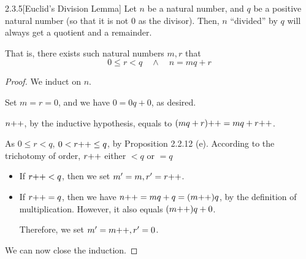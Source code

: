 \begin{exercise}{2.3.5}[Euclid's Division Lemma]
	Let $n$ be a natural number, and $q$ be a positive natural number (so that it is not 0 as the divisor). Then, $n$ ``divided'' by $q$ will always get a quotient and a remainder.
	
	That is, there exists such natural numbers $m,r$ that 
	\[
	0 \le r < q \quad \wedge \quad n = mq + r
	\]
\end{exercise}
\begin{proof}
	We induct on $n$.
	
	\mybcbox Set $m = r = 0$, and we have $0 = 0q + 0$, as desired.
	
	\myisbox $n{+}{+}$, by the inductive hypothesis, equals to $(mq+r){+}{+} = mq+r{+}{+}$.
	
	As $0 \le r < q$, $0 < r{+}{+} \le q$, by Proposition 2.2.12 (e). According to the trichotomy of order, $r{+}{+}$ either $<q$ or $=q$
	\begin{itemize}
		\item If $r{+}{+}<q$, then we set $m' = m, r' = r{+}{+}$.
		\item If $r{+}{+}=q$, then we have $n{+}{+} = mq + q = (m{+}{+})q$, by the definition of multiplication. However, it also equals $(m{+}{+})q + 0$.
		
		Therefore, we set $m' = m{+}{+}, r' = 0$.
	\end{itemize}

	We can now close the induction.
\end{proof}